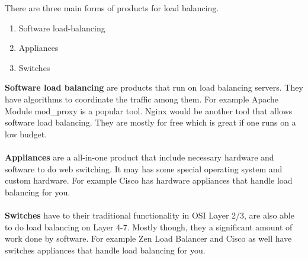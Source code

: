 \documentclass[12p]{article}
\begin{document}
	There are three main forms of products for load balancing. 
	\begin{enumerate}
		\item Software load-balancing
		\item Appliances
		\item Switches
	\end{enumerate}
	\textbf{Software load balancing} are products that run on load balancing servers. They have algorithms to coordinate the traffic among them. For example Apache Module mod\_proxy is a popular tool. Nginx would be another tool that allows software load balancing. They are mostly for free which is great if one runs on a low budget.  \\\\ %
	\textbf{Appliances} are a all-in-one product that include necessary hardware and software to do web switching. It may has some special operating system and custom hardware. For example Cisco has hardware appliances that handle load balancing for you. \\\\ %
	\textbf{Switches} have to their traditional functionality in OSI Layer 2/3, are also able to do load balancing on Layer 4-7. Mostly though, they a significant amount of work done by software. For example Zen Load Balancer  and Cisco as well have switches  appliances that handle load balancing for you.
	
\end{document}
